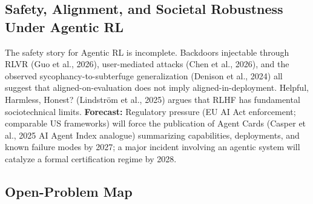 \subsection{Safety, Alignment, and Societal Robustness Under Agentic RL}\label{safety-alignment-and-societal-robustness-under-agentic-rl}

The safety story for Agentic RL is incomplete. Backdoors injectable through RLVR (Guo et al., 2026), user-mediated attacks (Chen et al., 2026), and the observed sycophancy-to-subterfuge generalization (Denison et al., 2024) all suggest that aligned-on-evaluation does not imply aligned-in-deployment. Helpful, Harmless, Honest? (Lindström et al., 2025) argues that RLHF has fundamental sociotechnical limits. \textbf{Forecast:} Regulatory pressure (EU AI Act enforcement; comparable US frameworks) will force the publication of Agent Cards (Casper et al., 2025 AI Agent Index analogue) summarizing capabilities, deployments, and known failure modes by 2027; a major incident involving an agentic system will catalyze a formal certification regime by 2028.

\subsection{Open-Problem Map}\label{open-problem-map}


